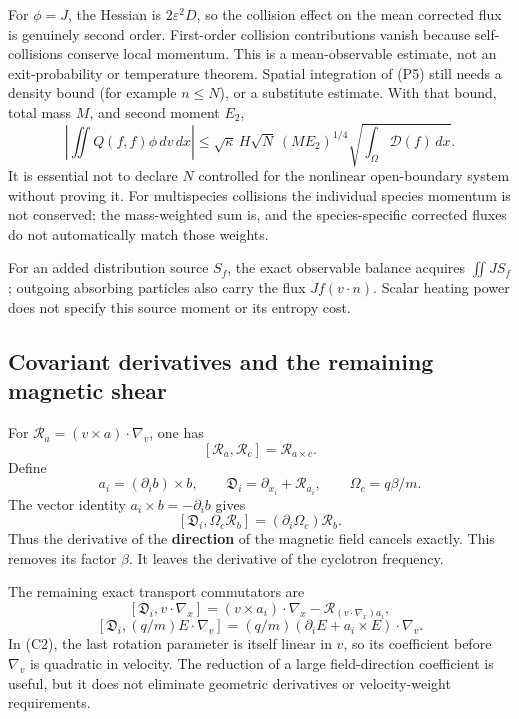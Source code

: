 For \(\phi=J\), the Hessian is \(2\varepsilon^2D\), so the collision
effect on the mean corrected flux is genuinely second order. First-order
collision contributions vanish because self-collisions conserve local
momentum. This is a mean-observable estimate, not an exit-probability or
temperature theorem. Spatial integration of (P5) still needs a density
bound (for example \(n\le N\)), or a substitute estimate. With that
bound, total mass \(M\), and second moment \(E_2\), \[
\left|\iint Q(f,f)\phi\,dv\,dx\right|
\le \sqrt{\kappa}\,H\sqrt N\,(ME_2)^{1/4}
       \sqrt{\int_\Omega\mathcal D(f)\,dx}.
\] It is essential not to declare \(N\) controlled for the nonlinear
open-boundary system without proving it. For multispecies collisions the
individual species momentum is not conserved; the mass-weighted sum is,
and the species-specific corrected fluxes do not automatically match
those weights.

For an added distribution source \(S_f\), the exact observable balance
acquires \(\iint J S_f\); outgoing absorbing particles also carry the
flux \(Jf(v\cdot n)\). Scalar heating power does not specify this source
moment or its entropy cost.

\subsection{Covariant derivatives and the remaining magnetic
shear}\label{covariant-derivatives-and-the-remaining-magnetic-shear}

For \(\mathcal R_a=(v\times a)\cdot\nabla_v\), one has \[
[\mathcal R_a,\mathcal R_c]=\mathcal R_{a\times c}.
\] Define \[
a_i=(\partial_i b)\times b,\qquad
\mathfrak D_i=\partial_{x_i}+\mathcal R_{a_i},\qquad
\Omega_c=q\beta/m.
\] The vector identity \(a_i\times b=-\partial_i b\) gives \[
[\mathfrak D_i,\Omega_c\mathcal R_b]
 =(\partial_i\Omega_c)\mathcal R_b.
\tag{C1}
\] Thus the derivative of the \textbf{direction} of the magnetic field
cancels exactly. This removes its factor \(\beta\). It leaves the
derivative of the cyclotron frequency.

The remaining exact transport commutators are \[
[\mathfrak D_i,v\cdot\nabla_x]
 =(v\times a_i)\cdot\nabla_x
   -\mathcal R_{(v\cdot\nabla_x)a_i},
\tag{C2}
\] \[
[\mathfrak D_i,(q/m)E\cdot\nabla_v]
 =(q/m)(\partial_iE+a_i\times E)\cdot\nabla_v.
\tag{C3}
\] In (C2), the last rotation parameter is itself linear in \(v\), so
its coefficient before \(\nabla_v\) is quadratic in velocity. The
reduction of a large field-direction coefficient is useful, but it does
not eliminate geometric derivatives or velocity-weight requirements.

